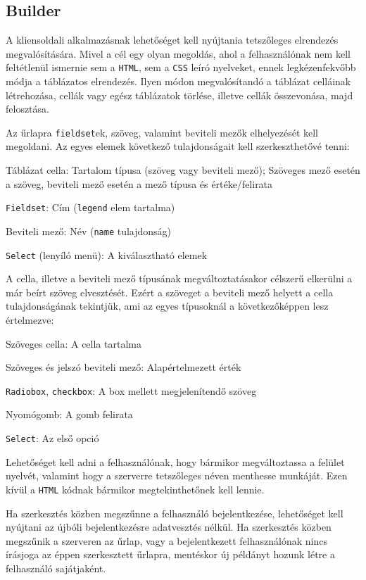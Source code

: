 \documentclass[12pt,a4paper,twoside]{article}
\newcommand{\desc}{
  \begin{description}{}{}
    \setlength\itemsep{0pt}
    \setlength\parskip{0pt}
    \setlength\topsep{0pt}
    \setlength\partopsep{0pt}
    \small}
\newcommand{\ed}{
  \end{description}
}
\begin{document}
\subsection{Builder}
\label{sec:spec}

A kliensoldali alkalmazásnak lehetőséget kell nyújtania tetszőleges elrendezés
megvalósítására. Mivel a cél egy olyan megoldás, ahol a felhasználónak nem kell
feltétlenül ismernie sem a \texttt{HTML}, sem a \texttt{CSS} leíró nyelveket,
ennek legkézenfekvőbb módja a táblázatos elrendezés. Ilyen módon megvalósítandó
a táblázat celláinak létrehozása, cellák vagy egész táblázatok törlése, illetve
cellák összevonása, majd felosztása.

Az űrlapra \texttt{fieldset}ek, szöveg, valamint beviteli mezők elhelyezését
kell megoldani. Az egyes elemek következő tulajdonságait kell szerkeszthetővé
tenni:

\clearpage
\desc
  \item[Táblázat cella:] Tartalom típusa (szöveg vagy beviteli mező); Szöveges
    mező esetén a szöveg, beviteli mező esetén a mező típusa és értéke/felirata
  \item[\texttt{Fieldset}:] Cím (\texttt{legend} elem tartalma)
  \item[Beviteli mező:] Név (\texttt{name} tulajdonság)
  \item[\texttt{Select} (lenyíló menü):] A kiválasztható elemek
\ed

A cella, illetve a beviteli mező típusának megváltoztatásakor célszerű elkerülni
a már beírt szöveg elvesztését. Ezért a szöveget a beviteli mező helyett a cella
tulajdonságának tekintjük, ami az egyes típusoknál a következőképpen lesz
értelmezve:

\desc
  \item[Szöveges cella:] A cella tartalma
  \item[Szöveges és jelszó beviteli mező:] Alapértelmezett érték
  \item[\texttt{Radiobox}, \texttt{checkbox}:] A box mellett megjelenítendő szöveg
  \item[Nyomógomb:] A gomb felirata
  \item[\texttt{Select}:] Az első opció
\ed

Lehetőséget kell adni a felhasználónak, hogy bármikor megváltoztassa a
felület nyelvét, valamint hogy a szerverre tetszőleges néven menthesse
munkáját. Ezen kívül a \texttt{HTML} kódnak bármikor megtekinthetőnek kell
lennie.

Ha szerkesztés közben megszűnne a felhasználó bejelentkezése, lehetőséget kell
nyújtani az újbóli bejelentkezésre adatvesztés nélkül. Ha szerkesztés közben
megszűnik a szerveren az űrlap, vagy a bejelentkezett felhasználónak nincs
írásjoga az éppen szerkesztett űrlapra, mentéskor új példányt hozunk létre a
felhasználó sajátjaként.
\end{document}
